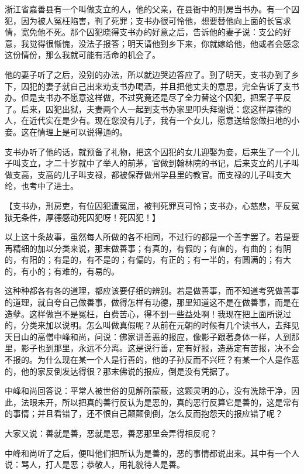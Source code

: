 \documentclass[12pt,twoside,openany]{book}
\newcommand{\kai}[1]{{\CJKfamily{kai}#1}}
\begin{document}
浙江省嘉善县有一个叫做支立的人，他的父亲，在县衙中的刑房当书办。有一个囚犯，因为被人冤枉陷害，判了死罪；支书办很可怜他，想要替他向上面的长官求情，宽免他不死。那个囚犯晓得支书办的好意之后，告诉他的妻子说：支公的好意，我觉得很惭愧，没法子报答；明天请他到乡下来，你就嫁给他，他或者会感念这份情份，那么我就可能有活命的机会了。

他的妻子听了之后，没别的办法，所以就边哭边答应了。到了明天，支书办到了乡下，囚犯的妻子就自己出来劝支书办喝酒，并且把他丈夫的意思，完全告诉了支书办。但是支书办不愿意这样做，不过究竟还是尽了全力替这个囚犯，把案子平反了。后来，囚犯出狱，夫妻两个人一起到支书办家里叩头拜谢说：您这样厚德的人，在近代实在是少有。现在您没有儿子，我有一个女儿，愿意送给您做扫地的小妾。这在情理上是可以说得通的。

支书办听了他的话，就预备了礼物，把这个囚犯的女儿迎娶为妾，后来生了一个儿子叫支立，才二十岁就中了举人的前茅，官做到翰林院的书记，后来支立的儿子叫做支高，支高的儿子叫支禄，都被保荐做州学县里的教官。而支禄的儿子叫支大纶，也考中了进士。

【\kai{支书办，刑房吏，有位囚犯遭冤屈，被判死罪真可怜；支书办，心慈悲，平反冤狱无条件，厚德感动死囚犯呀！死囚犯！}】

以上这十条故事，虽然每人所做的各不相同，不过行的都是一个善字罢了。若是要再精细的加以分类来说，那末做善事；有真的，有假的；有直的，有曲的；有阴的，有阳的；有是的，有不是的；有偏的，有正的；有一半的，有圆满的；有大的，有小的；有难的，有易的。

这种种都各有各的道理，都应该要仔细的辨别。若是做善事，而不知道考究做善事的道理，就自夸自己做善事，做得怎样有功德，那里知道这不是在做善事，而是在造孽。这样做岂不是冤枉，白费苦心，得不到一些益处啊！我现在把上面所说过的，分类来加以说明。怎么叫做真假呢？从前在元朝的时候有几个读书人，去拜见天目山的高僧中峰和尚，问说：佛家讲善恶的报应，像影子跟著身体一样，人到那里，影子也到那里，永远不分离。这是说行善，定有好报，造恶定有苦报，决不会不报的。为什么现在某一个人是行善的，他的子孙反而不兴旺？有某一个人是作恶的，他的家反倒发达得很？那末佛说的报应，倒是没有凭据了。

中峰和尚回答说：平常人被世俗的见解所蒙蔽，这颗灵明的心，没有洗除干净，因此，法眼未开，所以把真的善行反认为是恶的，真的恶行反算它是善的，这是常有的事情；并且看错了，还不恨自己颠颠倒倒，怎么反而抱怨天的报应错了呢？

大家又说：善就是善，恶就是恶，善恶那里会弄得相反呢？

中峰和尚听了之后，便叫他们把所认为是善的，恶的事情都说出来。其中有一个人说：骂人，打人是恶；恭敬人，用礼貌待人是善。
\end{document}
